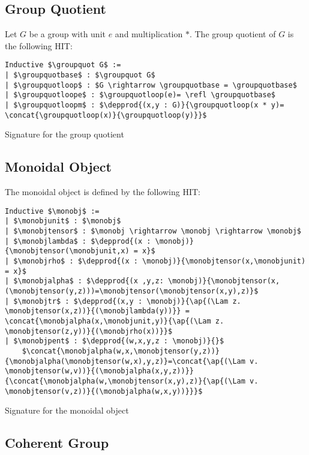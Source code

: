 \subsection{Group Quotient}
\label{sec:group_quotient}

Let $G$ be a group with unit $e$ and multiplication $*$. The group
quotient of $G$ is the following HIT:
\begin{lstlisting}[mathescape=true]
Inductive $\groupquot G$ :=
| $\groupquotbase$ : $\groupquot G$
| $\groupquotloop$ : $G \rightarrow \groupquotbase = \groupquotbase$
| $\groupquotloope$ : $\groupquotloop(e)= \refl \groupquotbase$
| $\groupquotloopm$ : $\depprod{(x,y : G)}{\groupquotloop(x * y)= \concat{\groupquotloop(x)}{\groupquotloop(y)}}$
\end{lstlisting}


Signature for the group quotient

\subsection{Monoidal Object}
\label{sec:monoidal_object}

The monoidal object is defined by the following HIT:
\begin{lstlisting}[mathescape=true]
Inductive $\monobj$ :=
| $\monobjunit$ : $\monobj$
| $\monobjtensor$ : $\monobj \rightarrow \monobj \rightarrow \monobj$
| $\monobjlambda$ : $\depprod{(x : \monobj)}{\monobjtensor(\monobjunit,x) = x}$
| $\monobjrho$ : $\depprod{(x : \monobj)}{\monobjtensor(x,\monobjunit) = x}$
| $\monobjalpha$ : $\depprod{(x ,y,z: \monobj)}{\monobjtensor(x,(\monobjtensor(y,z)))=\monobjtensor(\monobjtensor(x,y),z)}$
| $\monobjtr$ : $\depprod{(x,y : \monobj)}{\ap{(\Lam z. \monobjtensor(x,z))}{(\monobjlambda(y))}} = \concat{\monobjalpha(x,\monobjunit,y)}{\ap{(\Lam z. \monobjtensor(z,y))}{(\monobjrho(x))}}$
| $\monobjpent$ : $\depprod{(w,x,y,z : \monobj)}{}$
    $\concat{\monobjalpha(w,x,\monobjtensor(y,z))}{\monobjalpha(\monobjtensor(w,x),y,z)}=\concat{\ap{(\Lam v. \monobjtensor(w,v))}{(\monobjalpha(x,y,z))}}{\concat{\monobjalpha(w,\monobjtensor(x,y),z)}{\ap{(\Lam v. \monobjtensor(v,z))}{(\monobjalpha(w,x,y))}}}$
\end{lstlisting}

Signature for the monoidal object

\subsection{Coherent Group}
\label{sec:coeherent_group}

